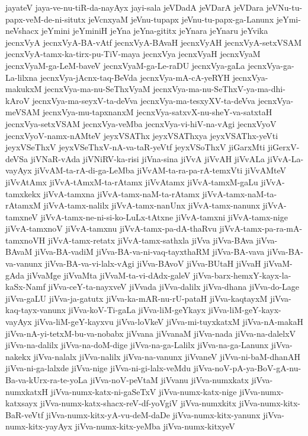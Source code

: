 {jayateV
jaya-ve-nu-tiR-da-nayAyx
jayi-sala
jeVDadA
jeVDarA
jeVDara
jeVNu-tu-papx-veM-de-ni-situtx
jeVcnxyaM
jeVnu-tupapx
jeVnu-tu-papx-ga-Lanunx
jeYmi-neVshacx
jeYmini
jeYminiH
jeYna
jeYna-gititx
jeYnara
jeYnaru
jeYvika
jecnxVyA
jecnxVyA-BA-vAtf
jecnxVyA-BAvaH
jecnxVyAH
jecnxVyA-setxVSAM
jecnxVyA-tamx-ka-tirx-pu-TiV-maya
jecnxVya
jecnxVyaH
jecnxVyaM
jecnxVyaM-ga-LeM-baveV
jecnxVyaM-ga-Le-raDU
jecnxVya-gaLa
jecnxVya-ga-La-lilxna
jecnxVya-jAcnx-taq-BeVda
jecnxVya-mA-cA-yeRYH
jecnxVya-makukxM
jecnxVya-ma-nu-SeThxVyaM
jecnxVya-ma-nu-SeThxV-ya-ma-dhi-kAroV
jecnxVya-ma-seyxV-ta-deVva
jecnxVya-ma-tesxyXV-ta-deVva
jecnxVya-meVSAM
jecnxVya-mu-tapxnanxM
jecnxVya-satxvX-nu-sheY-va-satxtaH
jecnxVya-setxVSAM
jecnxVya-veMba
jecnxVya-vi-hiV-na-vAgi
jecnxVyoV
jecnxVyoV-namx-nAMteV
jeyxVSAThx
jeyxVSAThxya
jeyxVSAThx-yeVti
jeyxVSeThxV
jeyxVSeThxV-nA-va-taR-yeVtf
jeyxVSoThxV
jiGarxMti
jiGerxV-deVSa
jiVNaR-vAda
jiVNiRV-ka-risi
jiVna-sina
jiVvA
jiVvAH
jiVvALa
jiVvA-La-vayAyx
jiVvAM-ta-rA-di-ga-LeMba
jiVvAM-ta-ra-pa-rA-temxVti
jiVvAMteV
jiVvAtAmx
jiVvA-tAmxM-ta-rAtamx
jiVvAtamx
jiVvA-tamxM-gaLu
jiVvA-tamxkekx
jiVvA-tamxna
jiVvA-tamx-naM-ta-rAtamx
jiVvA-tamx-naM-ta-rAtamxM
jiVvA-tamx-nalilx
jiVvA-tamx-nanUnx
jiVvA-tamx-nanunx
jiVvA-tamxneV
jiVvA-tamx-ne-ni-si-ko-LuLx-tAtxne
jiVvA-tamxni
jiVvA-tamx-nige
jiVvA-tamxnoV
jiVvA-tamxnu
jiVvA-tamx-pa-dA-thaRvu
jiVvA-tamx-pa-ra-mA-tamxnoVH
jiVvA-tamx-retatx
jiVvA-tamx-sathxla
jiVva
jiVva-BAva
jiVva-BAvaM
jiVva-BA-vadiM
jiVva-BA-va-ni-vaq-tayxthaRM
jiVva-BA-vava
jiVva-BA-va-vanunx
jiVva-BA-va-vi-lalx-vAgi
jiVva-BAvoV
jiVva-BUtaH
jiVvaH
jiVvaM-gAda
jiVvaMge
jiVvaMta
jiVvaM-ta-vi-dAdx-galeV
jiVva-barx-hemxY-kayx-la-kaSx-Namf
jiVva-ceY-ta-nayxveV
jiVvada
jiVva-dalilx
jiVva-dhana
jiVva-do-Lage
jiVva-gaLU
jiVva-ja-gatutx
jiVva-ka-mAR-nu-rU-pataH
jiVva-kaqtayxM
jiVva-kaq-tayx-vanunx
jiVva-koV-Ti-gaLa
jiVva-liM-geYkayx
jiVva-liM-geY-kayx-vayAyx
jiVva-liM-geY-kayxvu
jiVva-loVkeV
jiVva-mi-tuyxkatxM
jiVva-nA-makaH
jiVva-nA-yi-tetxM-bu-va-nobabx
jiVvana
jiVvanaM
jiVva-nada
jiVva-na-dalelxV
jiVva-na-dalilx
jiVva-na-doM-dige
jiVva-na-ga-Lalilx
jiVva-na-ga-Lanunx
jiVva-nakekx
jiVva-nalalx
jiVva-nalilx
jiVva-na-vanunx
jiVvaneV
jiVva-ni-baM-dhanAH
jiVva-ni-ga-lalxde
jiVva-nige
jiVva-ni-gi-lalx-veMdu
jiVva-noV-pA-ya-BoV-gA-nu-Ba-va-kUrx-ra-te-yoLa
jiVva-noV-peVtaM
jiVvanu
jiVva-numxkatx
jiVva-numxkatxH
jiVva-numx-katx-ni-gaSeTxV
jiVva-numx-katx-nige
jiVva-numx-katxsayx
jiVva-numx-katx-shacx-reV-df-yoVgiV
jiVva-numxkitx
jiVva-numx-kitx-BaR-veVtf
jiVva-numx-kitx-yA-vu-deM-daDe
jiVva-numx-kitx-yanunx
jiVva-numx-kitx-yayAyx
jiVva-numx-kitx-yeMba
jiVva-numx-kitxyeV
}
